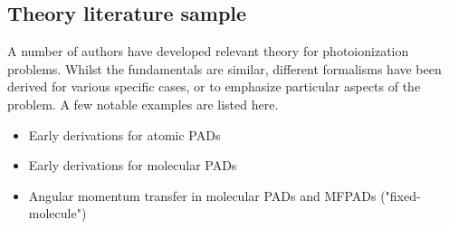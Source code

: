 \subsection{Theory literature sample\label{sec:theory-lit}}

A number of authors have developed relevant theory for photoionization problems. Whilst the fundamentals are similar, different formalisms have been derived for various specific cases, or to emphasize particular aspects of the problem. A few notable examples are listed here.

\begin{itemize}
\item Early derivations for atomic PADs \cite{Cherepkov1979,Cooper1968,Cooper1969,Klar1982}
\item Early derivations for molecular PADs \cite{Buckingham1970,Tully1968}
\item Angular momentum transfer in molecular PADs \cite{Fano1972} and MFPADs ("fixed-molecule") \cite{Dill1976}
\end{itemize}